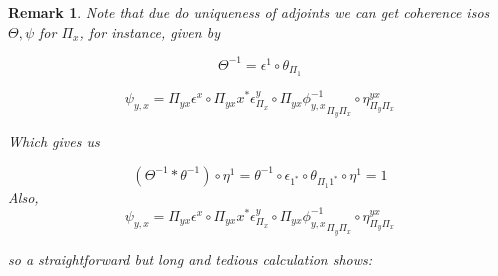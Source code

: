 \documentclass[10pt, oneside]{article}
\newtheorem{remark}[theorem]{Remark}
\begin{document}
\begin{remark}\label{rem:unit-identities}
    Note that due do uniqueness of adjoints we can get coherence isos $\Theta, \psi$ for $\Pi_x$, for instance, given by

    $$\Theta^{-1} = \epsilon^1 \circ \theta_{\Pi_1}$$

    $$\psi_{y, x} = \Pi_{yx} \epsilon^x \circ \Pi_{yx} x^\ast \epsilon^y_{\Pi_x} \circ \Pi_{yx} {\phi^{-1}_{y, x}}_{\Pi_y \Pi_x} \circ \eta^{yx}_{\Pi_y \Pi_x}$$

    Which gives us

    $$(\Theta^{-1} \ast \theta^{-1}) \circ \eta^1 = \theta^{-1} \circ \epsilon_{1^\ast} \circ \theta_{\Pi_1 1^\ast} \circ \eta^1 = 1$$
    Also,
    $$\psi_{y, x} = \Pi_{yx} \epsilon^x \circ \Pi_{yx} x^\ast \epsilon^y_{\Pi_x} \circ \Pi_{yx} {\phi^{-1}_{y, x}}_{\Pi_y \Pi_x} \circ \eta^{yx}_{\Pi_y \Pi_x}$$

    so a straightforward but long and tedious calculation shows:
    

\end{remark}
\end{document}
